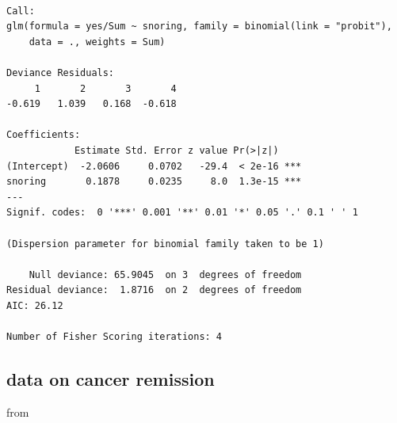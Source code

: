 \documentclass[]{book}
\newenvironment{Shaded}{\begin{snugshade}}{\end{snugshade}}
\newcommand{\DataTypeTok}[1]{\textcolor[rgb]{0.13,0.29,0.53}{#1}}
\newcommand{\KeywordTok}[1]{\textcolor[rgb]{0.13,0.29,0.53}{\textbf{#1}}}
\newcommand{\NormalTok}[1]{#1}
\newcommand{\OperatorTok}[1]{\textcolor[rgb]{0.81,0.36,0.00}{\textbf{#1}}}
\newcommand{\StringTok}[1]{\textcolor[rgb]{0.31,0.60,0.02}{#1}}
\begin{document}
\begin{verbatim}

Call:
glm(formula = yes/Sum ~ snoring, family = binomial(link = "probit"), 
    data = ., weights = Sum)

Deviance Residuals: 
     1       2       3       4  
-0.619   1.039   0.168  -0.618  

Coefficients:
            Estimate Std. Error z value Pr(>|z|)    
(Intercept)  -2.0606     0.0702   -29.4  < 2e-16 ***
snoring       0.1878     0.0235     8.0  1.3e-15 ***
---
Signif. codes:  0 '***' 0.001 '**' 0.01 '*' 0.05 '.' 0.1 ' ' 1

(Dispersion parameter for binomial family taken to be 1)

    Null deviance: 65.9045  on 3  degrees of freedom
Residual deviance:  1.8716  on 2  degrees of freedom
AIC: 26.12

Number of Fisher Scoring iterations: 4
\end{verbatim}

\begin{Shaded}
\end{Shaded}

\hypertarget{data-on-cancer-remission}{%
\subsection{data on cancer remission}\label{data-on-cancer-remission}}

from \citet{Agresti:2007aa}

\begin{Shaded}
\end{Shaded}
\end{document}
